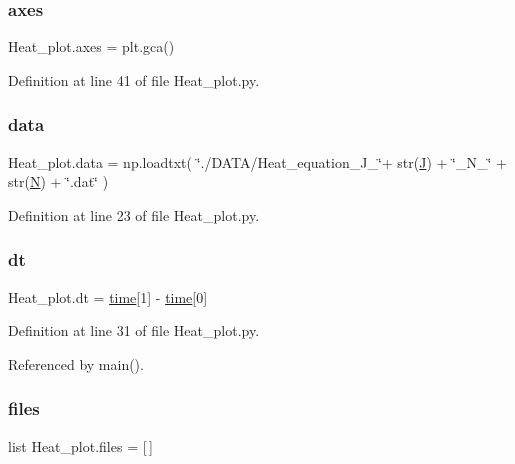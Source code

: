 \subsubsection{\texorpdfstring{axes}{axes}}
{\footnotesize\ttfamily Heat\+\_\+plot.\+axes = plt.\+gca()}



Definition at line 41 of file Heat\+\_\+plot.\+py.

\mbox{\label{namespaceHeat__plot_a5f174ddffb3702db438b5922b832de2d}} 
\subsubsection{\texorpdfstring{data}{data}}
{\footnotesize\ttfamily Heat\+\_\+plot.\+data = np.\+loadtxt( \char`\"{}./D\+A\+TA/Heat\+\_\+equation\+\_\+\+J\+\_\+\char`\"{}+ str(\hyperlink{namespaceHeat__plot_a3cafcec38d886f33b35756791964bb58}{J}) + \char`\"{}\+\_\+\+N\+\_\+\char`\"{} + str(\hyperlink{namespaceHeat__plot_a7d050092798e28458a263710837bda77}{N}) + \char`\"{}.dat\char`\"{} )}



Definition at line 23 of file Heat\+\_\+plot.\+py.

\mbox{\label{namespaceHeat__plot_ab03c1902ecb064f92219fa9cd5f140d1}} 
\subsubsection{\texorpdfstring{dt}{dt}}
{\footnotesize\ttfamily Heat\+\_\+plot.\+dt = \hyperlink{namespaceHeat__plot_a05e6ef830fa9da56c9ca594a34b644be}{time}\mbox{[}1\mbox{]} -\/ \hyperlink{namespaceHeat__plot_a05e6ef830fa9da56c9ca594a34b644be}{time}\mbox{[}0\mbox{]}}



Definition at line 31 of file Heat\+\_\+plot.\+py.



Referenced by main().

\mbox{\label{namespaceHeat__plot_a301b7278a9fd50c9e155fa008f74452f}} 
\subsubsection{\texorpdfstring{files}{files}}
{\footnotesize\ttfamily list Heat\+\_\+plot.\+files = \mbox{[}$\,$\mbox{]}}



